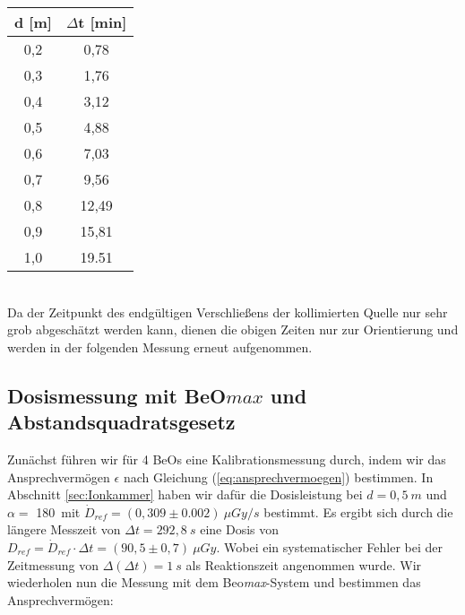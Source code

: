 \vspace{5mm}
\minipanf
	\begin{center}
		\begin{tabular}{c|c}
				   \textbf{d} [m] & \textbf{$\Delta$t} [min] \\ 
		\hline     0,2 &  0,78 \\ 
				   0,3 &  1,76 \\ 
				   0,4 &  3,12 \\ 
				   0,5 &  4,88 \\ 
				   0,6 &  7,03 \\ 
				   0,7 &  9,56 \\ 
				   0,8 & 12,49 \\ 
				   0,9 & 15,81 \\ 
				   1,0 & 19.51 \\  
		\end{tabular}
		\label{dft:Zeiten} 
	\end{center}
\minipend
\vspace{5mm}
\ \\
Da der Zeitpunkt des endgültigen Verschließens der kollimierten Quelle nur sehr grob abgeschätzt werden kann, dienen die obigen Zeiten nur zur Orientierung und werden in der folgenden Messung erneut aufgenommen.

\subsection{Dosismessung mit BeO$max$ und Abstandsquadratsgesetz}
Zunächst führen wir für 4 BeOs eine Kalibrationsmessung durch, indem wir das Ansprechvermögen $\epsilon$ nach Gleichung (\ref{eq:ansprechvermoegen}) bestimmen. In Abschnitt \ref{sec:Ionkammer} haben wir dafür die Dosisleistung bei $d=0,5\ \unit{m}$ und $\alpha =$ 180\textdegree \ mit $\dot{D}_{ref} = (0,309 \pm 0.002)\ \unit{\mu Gy} /s$ bestimmt. Es ergibt sich durch die längere Mess\-zeit von $\Delta t = 292,8\ \unit{s}$ eine Dosis von $D_{ref} = \dot{D}_{ref} \cdot \Delta t = (90,5 \pm 0,7)\ \unit{\mu Gy}$. Wobei ein systematischer Fehler bei der Zeitmessung von $\Delta(\Delta t) = 1\ \unit{s}$ als Reaktionszeit angenommen wurde. Wir wiederholen nun die Messung mit dem Beo\textit{max}-System und bestimmen das Ansprechvermögen:\\

